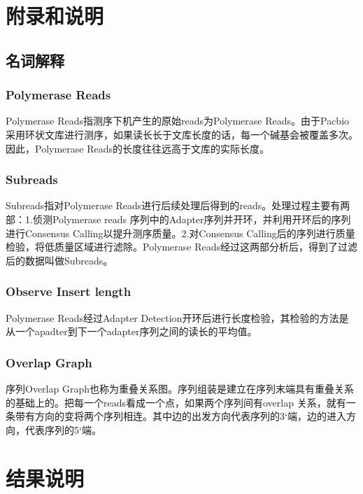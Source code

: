 \section{附录和说明}
\subsection{名词解释}
\subsubsection{Polymerase Reads}
Polymerase Reads指测序下机产生的原始reads为Polymerase Reads。由于Pacbio采用环状文库进行测序，如果读长长于文库长度的话，每一个碱基会被覆盖多次。因此，Polymerase Reads的长度往往远高于文库的实际长度。
\subsubsection{Subreads}
Subreads指对Polymerase Reads进行后续处理后得到的reads。处理过程主要有两部：1.侦测Polymerase reads 序列中的Adapter序列并开环，并利用开环后的序列进行Consensus Calling以提升测序质量。2.对Consensus Calling后的序列进行质量检验，将低质量区域进行滤除。Polymerase Reads经过这两部分析后，得到了过滤后的数据叫做Subreads。
\subsubsection{Observe Insert length}
Polymerase Reads经过Adapter Detection开环后进行长度检验，其检验的方法是从一个apadter到下一个adapter序列之间的读长的平均值。
\subsubsection{Overlap Graph}
序列Overlap Graph也称为重叠关系图。序列组装是建立在序列末端具有重叠关系的基础上的。把每一个reads看成一个点，如果两个序列间有overlap 关系，就有一条带有方向的变将两个序列相连。其中边的出发方向代表序列的3‘端，边的进入方向，代表序列的5‘端。
 
\section{结果说明}
